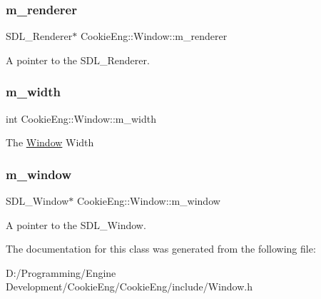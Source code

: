 \subsubsection{\texorpdfstring{m\+\_\+renderer}{m\_renderer}}
{\footnotesize\ttfamily S\+D\+L\+\_\+\+Renderer$\ast$ Cookie\+Eng\+::\+Window\+::m\+\_\+renderer\hspace{0.3cm}{\ttfamily [protected]}}

A pointer to the S\+D\+L\+\_\+\+Renderer. \mbox{\label{class_cookie_eng_1_1_window_a82302880d6f0fa6771a38cae96c86644}} 
\subsubsection{\texorpdfstring{m\+\_\+width}{m\_width}}
{\footnotesize\ttfamily int Cookie\+Eng\+::\+Window\+::m\+\_\+width\hspace{0.3cm}{\ttfamily [protected]}}

The \hyperlink{class_cookie_eng_1_1_window}{Window} Width \mbox{\label{class_cookie_eng_1_1_window_a34a72976d2a24ceee23b88e3751a76bd}} 
\subsubsection{\texorpdfstring{m\+\_\+window}{m\_window}}
{\footnotesize\ttfamily S\+D\+L\+\_\+\+Window$\ast$ Cookie\+Eng\+::\+Window\+::m\+\_\+window\hspace{0.3cm}{\ttfamily [protected]}}

A pointer to the S\+D\+L\+\_\+\+Window. 

The documentation for this class was generated from the following file\+:\begin{DoxyCompactItemize}
\item 
D\+:/\+Programming/\+Engine Development/\+Cookie\+Eng/\+Cookie\+Eng/include/Window.\+h\end{DoxyCompactItemize}
